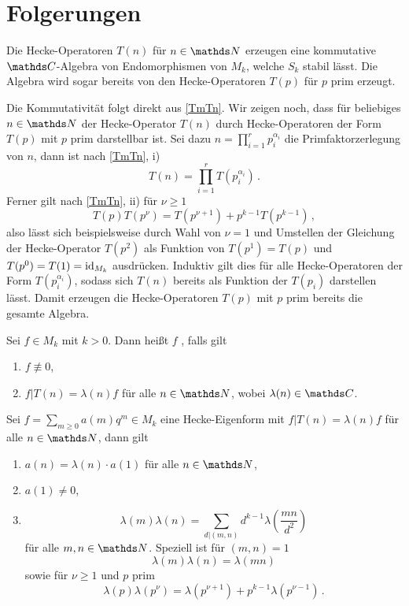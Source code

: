 \section{Folgerungen}

\begin{satz}
Die Hecke-Operatoren $T(n)$ für $n \in \NN$ erzeugen eine kommutative $\CC$-Algebra von Endomorphismen von $M_k$, welche $S_k$ stabil lässt. Die Algebra wird sogar bereits von den Hecke-Operatoren $T(p)$ für $p$ prim erzeugt.
\end{satz}

\begin{bewe}
Die Kommutativität folgt direkt aus \autoref{TmTn}. Wir zeigen noch, dass für beliebiges $n \in \NN$ der Hecke-Operator $T(n)$ durch Hecke-Operatoren der Form $T(p)$ mit $p$ prim darstellbar ist. Sei dazu $n = \prod_{i=1}^{r} p_i^{\alpha_i}$ die Primfaktorzerlegung von $n$, dann ist nach \autoref{TmTn}, i)
\[
T(n) = \prod_{i=1}^{r} T(p_i^{\alpha_i})
\,.
\]
Ferner gilt nach \autoref{TmTn}, ii) für $\nu \geq 1$
\[
T(p) T(p^\nu) = T(p^{\nu+1}) + p^{k-1} T(p^{k-1})
\,,
\]
also lässt sich beispielsweise durch Wahl von $\nu = 1$ und Umstellen der Gleichung der Hecke-Operator $T(p^2)$ als Funktion von $T(p^1) = T(p)$ und $T(p^0) = T(1) = \operatorname{id}_{M_k}$ ausdrücken. Induktiv gilt dies für alle Hecke-Operatoren der Form $T(p_i^{\alpha_i})$, sodass sich $T(n)$ bereits als Funktion der $T(p_i)$ darstellen lässt. Damit erzeugen die Hecke-Operatoren $T(p)$ mit $p$ prim bereits die gesamte Algebra.
\end{bewe}

\begin{defi}
Sei $f \in M_k$ mit $k > 0$. Dann heißt $f$ , falls gilt
\begin{enumerate}
\item $f \not \equiv 0$,
\item $f | T(n) = \lambda(n) f$ für alle $n \in \NN$, wobei $\lambda(n) \in \CC$.
\end{enumerate}
\end{defi}

\begin{satz}
Sei $f = \sum_{m \geq 0} a(m) q^m \in M_k$ eine Hecke-Eigenform mit $f | T(n) = \lambda(n) f$ für alle $n \in \NN$, dann gilt
\begin{enumerate}
\item $a(n) = \lambda(n) \cdot a(1)$ für alle $n \in \NN$,
\item $a(1) \neq 0$, 
\item \[
\lambda(m) \lambda(n) = \sum_{d \vert (m,n)} d^{k-1} \lambda \left( \frac {mn}{d^2} \right)
\]
für alle $m,n \in \NN$. Speziell ist für $(m, n) = 1$
\[
\lambda(m) \lambda(n) = \lambda(mn)
\]
sowie für $\nu \geq 1$ und $p$ prim
\[
\lambda(p) \lambda(p^\nu) = \lambda(p^{\nu+1}) + p^{k-1}\lambda(p^{\nu-1})
\,.
\]
\end{enumerate}
\end{satz}

